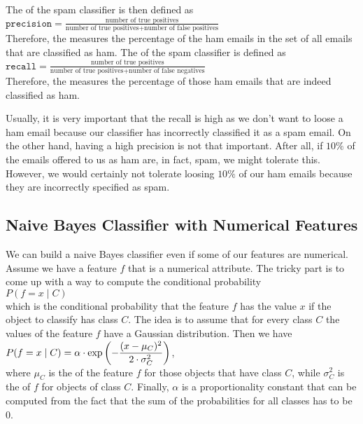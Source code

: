 \begin{enumerate}
      The  of the spam classifier is then defined as
      \\[0.2cm]
      \hspace*{1.3cm}
      $ \texttt{precision} = \frac{\mbox{number of true positives}}{\mbox{number of true positives} + \mbox{number of false positives}} $
      \\[0.2cm]
      Therefore, the  measures the percentage of the ham emails in the set of all emails that are classified as ham.
      The  of the spam classifier is defined as
      \\[0.2cm]
      \hspace*{1.3cm}
      $ \texttt{recall} = \frac{\mbox{number of true positives}}{\mbox{number of true positives} + \mbox{number of false negatives}} $
      \\[0.2cm]
      Therefore, the  measures the percentage of those ham emails that are indeed classified as ham.  

      Usually, it is very important that the recall is high as we don't want to loose a ham email because our classifier has incorrectly classified it as a spam email.  
      On the other hand, having a high precision is not that important.  After all, if $10\%$ of the emails
      offered to us as ham are, in fact, spam, we might tolerate this.  However, we
      would certainly not tolerate loosing $10\%$ of our ham emails because they are
      incorrectly specified as spam.       
\end{enumerate}

\subsection{Naive Bayes Classifier with Numerical Features}
We can build a naive Bayes classifier even if some of our features are numerical.  Assume we have a feature $f$
that is a numerical attribute.  The tricky part is to come up with a way to compute the conditional probability
\\[0.2cm]
\hspace*{1.3cm}
$P(f = x \mid C)$
\\[0.2cm]
which is the conditional probability that the feature $f$ has the value $x$ if the object to classify has class
$C$.  The idea is to assume that for every class $C$ the values of the feature $f$ have a Gaussian
distribution.  Then we have
\\[0.2cm]
\hspace*{1.3cm}
$\displaystyle P(f = x \mid C) = \alpha \cdot \exp\left(-\frac{(x-\mu_C)^2}{2 \cdot \sigma_C^2}\right)$,
\\[0.2cm]
where $\mu_C$ is the  of the feature $f$ for those objects that have class $C$, while
$\sigma_C^2$ is the  of $f$ for objects of class $C$.
Finally, $\alpha$ is a proportionality constant that can be computed from the
fact that the sum of the  probabilities for all classes has to be $0$.

